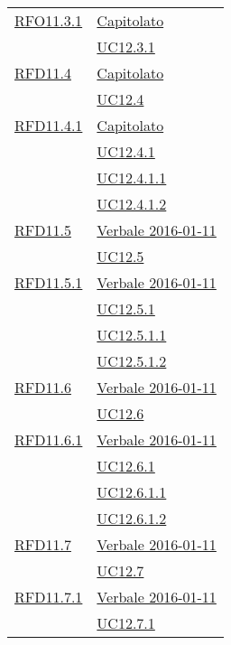 \begin{longtable}{|>{\centering}m{5cm}|m{5cm}<{\centering}|}
\hyperlink{RFO11.3.1}{RFO11.3.1} & \hyperlink{Capitolato}{Capitolato}\\
& \hyperref[UC12.3.1]{UC12.3.1}\\ \hline

\hyperlink{RFD11.4}{RFD11.4} & \hyperlink{Capitolato}{Capitolato}\\
& \hyperref[UC12.4]{UC12.4}\\ \hline

\hyperlink{RFD11.4.1}{RFD11.4.1} & \hyperlink{Capitolato}{Capitolato}\\
& \hyperref[UC12.4.1]{UC12.4.1}\\
& \hyperref[UC12.4.1.1]{UC12.4.1.1}\\
& \hyperref[UC12.4.1.2]{UC12.4.1.2}\\ \hline

\hyperlink{RFD11.5}{RFD11.5} & \hyperlink{Verbale 2016-01-11}{Verbale 2016-01-11}\\
& \hyperref[UC12.5]{UC12.5}\\ \hline

\hyperlink{RFD11.5.1}{RFD11.5.1} & \hyperlink{Verbale 2016-01-11}{Verbale 2016-01-11}\\
& \hyperref[UC12.5.1]{UC12.5.1}\\
& \hyperref[UC12.5.1.1]{UC12.5.1.1}\\
& \hyperref[UC12.5.1.2]{UC12.5.1.2}\\ \hline

\hyperlink{RFD11.6}{RFD11.6} & \hyperlink{Verbale 2016-01-11}{Verbale 2016-01-11}\\
& \hyperref[UC12.6]{UC12.6}\\ \hline

\hyperlink{RFD11.6.1}{RFD11.6.1} & \hyperlink{Verbale 2016-01-11}{Verbale 2016-01-11}\\
& \hyperref[UC12.6.1]{UC12.6.1}\\
& \hyperref[UC12.6.1.1]{UC12.6.1.1}\\
& \hyperref[UC12.6.1.2]{UC12.6.1.2}\\ \hline

\hyperlink{RFD11.7}{RFD11.7} & \hyperlink{Verbale 2016-01-11}{Verbale 2016-01-11}\\
& \hyperref[UC12.7]{UC12.7}\\ \hline

\hyperlink{RFD11.7.1}{RFD11.7.1} & \hyperlink{Verbale 2016-01-11}{Verbale 2016-01-11}\\
& \hyperref[UC12.7.1]{UC12.7.1}\\ \hline


\end{longtable}
